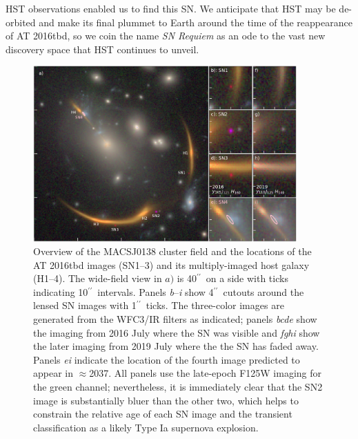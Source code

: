 \documentclass[12pt]{article}
\gdef\arcsec{$^{\prime\prime}$}
\def\TNSname{AT 2016tbd\xspace}
\def\SNABC{AT 2016tbd\xspace}
\begin{document}
HST observations enabled us to find this SN.  We anticipate that HST may be de-orbited and make its final plummet to Earth around the time of the reappearance of \TNSname, so we coin the name {\it SN  Requiem} as an ode to the vast new discovery space that HST continues to unveil.




\clearpage
\begin{figure}
    \centering
    \includegraphics[draft=False,width=0.9\textwidth]{Paper/Figures/fig1_layout_sn4.pdf}
    \caption{Overview of the MACSJ0138 cluster field and the locations of the \SNABC images  (SN1--3) and its multiply-imaged host galaxy (H1--4). The wide-field view in $a)$ is 40\arcsec\ on a side with ticks indicating 10\arcsec\ intervals.  
    Panels \emph{b}--\emph{i} show 4\arcsec\ cutouts around the lensed SN images with 1\arcsec\ ticks.  The three-color images are generated from the WFC3/IR filters as indicated; panels \emph{bcde} show the imaging from 2016 July where the SN was visible and \emph{fghi} show the later imaging from 2019 July where the the SN has faded away.  Panels \emph{ei} indicate the location of the fourth image predicted to appear in $\approx$2037. All panels use the late-epoch F125W imaging for the green channel; nevertheless, it is immediately clear that the SN2 image is substantially bluer than the other two, which helps to constrain the relative age of each SN image and the transient classification as a likely Type Ia supernova explosion.}
    
    \label{fig:layout}
\end{figure}
\end{document}
